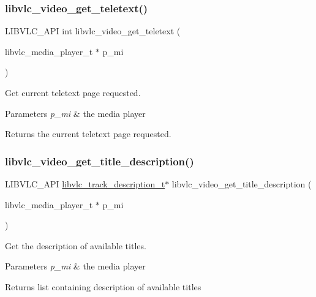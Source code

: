 \subsubsection{\texorpdfstring{libvlc\+\_\+video\+\_\+get\+\_\+teletext()}{libvlc\_video\_get\_teletext()}}
{\footnotesize\ttfamily L\+I\+B\+V\+L\+C\+\_\+\+A\+PI int libvlc\+\_\+video\+\_\+get\+\_\+teletext (\begin{DoxyParamCaption}\item[{libvlc\+\_\+media\+\_\+player\+\_\+t $\ast$}]{p\+\_\+mi }\end{DoxyParamCaption})}

Get current teletext page requested.


\begin{DoxyParams}{Parameters}
{\em p\+\_\+mi} & the media player \\
\hline
\end{DoxyParams}
\begin{DoxyReturn}{Returns}
the current teletext page requested. 
\end{DoxyReturn}
\mbox{\label{group__libvlc__video_gad14d920e740c5f6ba378b7b6124ece94}} 
\subsubsection{\texorpdfstring{libvlc\+\_\+video\+\_\+get\+\_\+title\+\_\+description()}{libvlc\_video\_get\_title\_description()}}
{\footnotesize\ttfamily L\+I\+B\+V\+L\+C\+\_\+\+A\+PI \hyperlink{structlibvlc__track__description__t}{libvlc\+\_\+track\+\_\+description\+\_\+t}$\ast$ libvlc\+\_\+video\+\_\+get\+\_\+title\+\_\+description (\begin{DoxyParamCaption}\item[{libvlc\+\_\+media\+\_\+player\+\_\+t $\ast$}]{p\+\_\+mi }\end{DoxyParamCaption})}

Get the description of available titles.


\begin{DoxyParams}{Parameters}
{\em p\+\_\+mi} & the media player \\
\hline
\end{DoxyParams}
\begin{DoxyReturn}{Returns}
list containing description of available titles 
\end{DoxyReturn}
\mbox{\label{group__libvlc__video_ga73827c7709674b557f873b79a6b6b78e}} 
